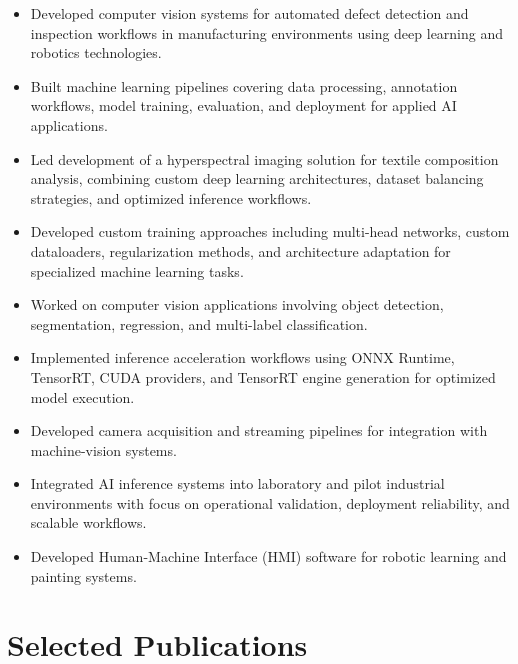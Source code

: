 \documentclass[11pt,a4paper]{article}
\begin{document}
\begin{itemize}

\item Developed computer vision systems for automated defect detection and inspection workflows in manufacturing environments using deep learning and robotics technologies.

\item Built machine learning pipelines covering data processing, annotation workflows, model training, evaluation, and deployment for applied AI applications.

\item Led development of a hyperspectral imaging solution for textile composition analysis, combining custom deep learning architectures, dataset balancing strategies, and optimized inference workflows.

\item Developed custom training approaches including multi-head networks, custom dataloaders, regularization methods, and architecture adaptation for specialized machine learning tasks.

\item Worked on computer vision applications involving object detection, segmentation, regression, and multi-label classification.

\item Implemented inference acceleration workflows using ONNX Runtime, TensorRT, CUDA providers, and TensorRT engine generation for optimized model execution.

\item Developed camera acquisition and streaming pipelines for integration with machine-vision systems.

\item Integrated AI inference systems into laboratory and pilot industrial environments with focus on operational validation, deployment reliability, and scalable workflows.

\item Developed Human-Machine Interface (HMI) software for robotic learning and painting systems.

\end{itemize}


\section*{\Large Selected Publications}
\end{document}
